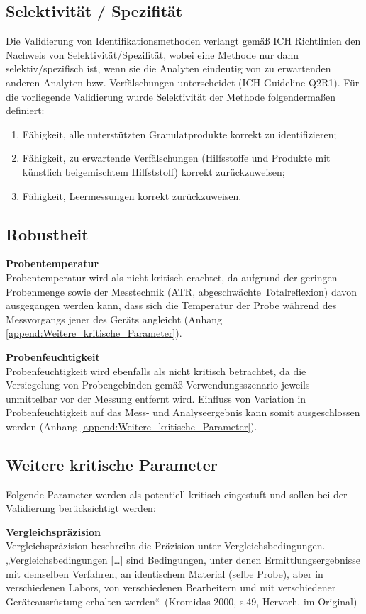 \documentclass[11pt, a4paper]{article}
\begin{document}
\subsection{Selektivität / Spezifität}
Die Validierung von Identifikationsmethoden verlangt gemäß ICH Richtlinien den Nachweis von Selektivität/Spezifität, wobei eine Methode nur dann selektiv/spezifisch ist, wenn sie die Analyten eindeutig von zu erwartenden anderen Analyten bzw. Verfälschungen unterscheidet (ICH Guideline Q2R1). Für die vorliegende Validierung wurde Selektivität der Methode folgendermaßen definiert:
\begin{enumerate}
\item 	Fähigkeit, alle unterstützten Granulatprodukte korrekt zu identifizieren;
\item 	Fähigkeit, zu erwartende Verfälschungen (Hilfsstoffe und Produkte mit künstlich beigemischtem Hilfststoff) korrekt zurückzuweisen;
\item	Fähigkeit, Leermessungen korrekt zurückzuweisen.
\end{enumerate}

\subsection{Robustheit}
\label{sec:Robustheit}
\textbf{Probentemperatur}\\[1.2pt]
Probentemperatur wird als nicht kritisch erachtet, da aufgrund der geringen Probenmenge sowie der Messtechnik (ATR, abgeschwächte Totalreflexion) davon ausgegangen werden kann, dass sich die Temperatur der Probe während des Messvorgangs jener des Geräts angleicht (Anhang \ref{append:Weitere_kritische_Parameter}).

\textbf{Probenfeuchtigkeit}\\[1.2pt]
Probenfeuchtigkeit wird ebenfalls als nicht kritisch betrachtet, da die Versiegelung von Probengebinden gemäß Verwendungsszenario jeweils unmittelbar vor der Messung entfernt wird. Einfluss von Variation in Probenfeuchtigkeit auf das Mess- und Analyseergebnis kann somit ausgeschlossen werden (Anhang \ref{append:Weitere_kritische_Parameter}).


\subsection{Weitere kritische Parameter}
Folgende Parameter werden als potentiell kritisch eingestuft und sollen bei der Validierung berücksichtigt werden:

\textbf{Vergleichspräzision} \\[1.2pt]
Vergleichspräzision beschreibt die Präzision unter Vergleichsbedingungen. „Vergleichsbedingungen […] sind Bedingungen, unter denen Ermittlungsergebnisse mit demselben Verfahren, an identischem Material (selbe Probe), aber in verschiedenen Labors, von verschiedenen Bearbeitern und mit verschiedener Geräteausrüstung erhalten werden“. (Kromidas 2000, s.49, Hervorh. im Original) \\
\end{document}
